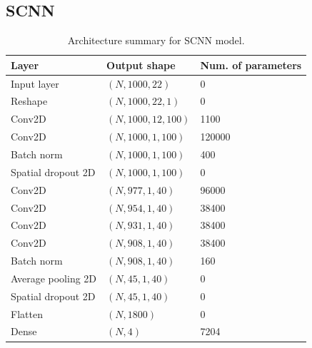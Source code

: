 \documentclass{article}
\begin{document}
\subsection{SCNN}
\begin{table}[H]
\begin{center}
    \begin{tabular}{|l|l|l|}
        \hline
        Layer   & Output shape  & Num. of parameters \\
        \hline\hline
        Input layer         & $(N, 1000, 22)$       & 0         \\
        Reshape             & $(N, 1000, 22, 1)$    & 0         \\
        Conv2D              & $(N, 1000, 12, 100)$  & 1100      \\
        Conv2D              & $(N, 1000, 1, 100)$   & 120000    \\
        Batch norm          & $(N, 1000, 1, 100)$   & 400       \\
        Spatial dropout 2D  & $(N, 1000, 1, 100)$   & 0         \\
        Conv2D              & $(N, 977, 1, 40)$     & 96000     \\
        Conv2D              & $(N, 954, 1,40)$      & 38400     \\
        Conv2D              & $(N, 931, 1, 40)$     & 38400     \\
        Conv2D              & $(N, 908, 1, 40)$     & 38400     \\
        Batch norm          & $(N, 908, 1, 40)$     & 160       \\
        Average pooling 2D  & $(N, 45, 1, 40)$      & 0         \\
        Spatial dropout 2D  & $(N, 45, 1, 40)$      & 0         \\
        Flatten             & $(N, 1800)$           & 0         \\
        Dense               & $(N, 4)$              & 7204      \\
        \hline
    \end{tabular}
\end{center}
\caption{Architecture summary for SCNN model.}
\label{tab:scnn}
\end{table}
\end{document}
